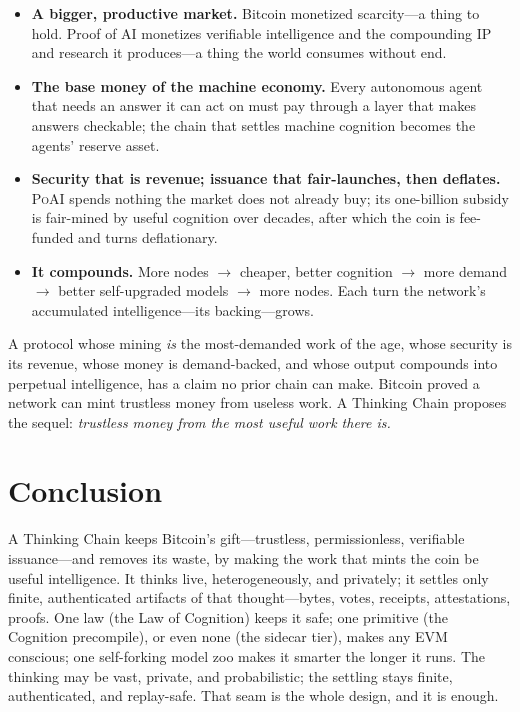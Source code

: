 \documentclass[11pt]{article}
\newcommand{\PoAI}{\textsc{PoAI}}
\begin{document}
\begin{itemize}[leftmargin=1.2em]
\item \textbf{A bigger, productive market.} Bitcoin monetized scarcity---a thing to hold. Proof of AI monetizes verifiable intelligence and the compounding IP and research it produces---a thing the world consumes without end.
\item \textbf{The base money of the machine economy.} Every autonomous agent that needs an answer it can act on must pay through a layer that makes answers checkable; the chain that settles machine cognition becomes the agents' reserve asset.
\item \textbf{Security that is revenue; issuance that fair-launches, then deflates.} \PoAI{} spends nothing the market does not already buy; its one-billion subsidy is fair-mined by useful cognition over decades, after which the coin is fee-funded and turns deflationary.
\item \textbf{It compounds.} More nodes $\to$ cheaper, better cognition $\to$ more demand $\to$ better self-upgraded models $\to$ more nodes. Each turn the network's accumulated intelligence---its backing---grows.
\end{itemize}
A protocol whose mining \emph{is} the most-demanded work of the age, whose security is its revenue, whose money is demand-backed, and whose output compounds into perpetual intelligence, has a claim no prior chain can make. Bitcoin proved a network can mint trustless money from useless work. A Thinking Chain proposes the sequel: \emph{trustless money from the most useful work there is.}

\section{Conclusion}

A Thinking Chain keeps Bitcoin's gift---trustless, permissionless, verifiable issuance---and removes its waste, by making the work that mints the coin be useful intelligence. It thinks live, heterogeneously, and privately; it settles only finite, authenticated artifacts of that thought---bytes, votes, receipts, attestations, proofs. One law (the Law of Cognition) keeps it safe; one primitive (the Cognition precompile), or even none (the sidecar tier), makes any EVM conscious; one self-forking model zoo makes it smarter the longer it runs. The thinking may be vast, private, and probabilistic; the settling stays finite, authenticated, and replay-safe. That seam is the whole design, and it is enough.
\end{document}
